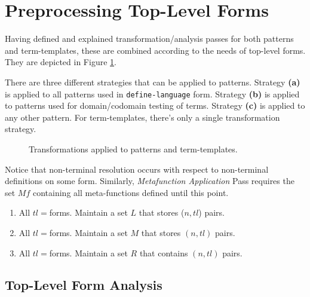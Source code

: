 \section{Preprocessing Top-Level Forms}

Having defined and explained transformation/analysis passes for both patterns and term-templates, these are combined according to the needs of top-level forms. They are depicted in Figure \ref{transform-pipeline}. 

There are three different strategies that can be applied to patterns. Strategy \textbf{(a)} is applied to all patterns used in \texttt{define-language} form. Strategy \textbf{(b)} is applied to patterns used for domain/codomain testing of terms. Strategy \textbf{(c)} is applied to any other pattern. For term-templates, there's only a single transformation strategy.

\begin{figure}[ht]
\centering
	\caption{Transformations applied to patterns and term-templates.}
	\label{transform-pipeline}
\end{figure}


Notice that non-terminal resolution occurs with respect to non-terminal definitions on some \DefineLanguageNoArg \space form. Similarly, \textit{Metafunction Application} Pass requires the set $Mf$ containing all meta-functions defined until this point. 

\begin{enumerate}
\item All $tl=$\space \TlDefineLanguage \space forms. Maintain a set $L$ that stores ($n, tl$) pairs.
\item All $tl=$\space \TlDefineMetafunction \space forms. Maintain a set $M$ that stores $(n, tl)$ pairs.
\item All $tl=$\space \TlDefineReductionRelation \space forms. Maintain a set $R$ that contains $(n, tl)$ pairs.
\end{enumerate}

\subsection{Top-Level Form Analysis}

